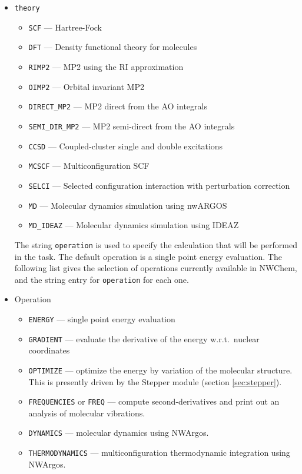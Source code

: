 \begin{itemize}
\item \verb+theory+ \newline
\begin{itemize}
 \item \verb+SCF+ --- Hartree-Fock
 \item \verb+DFT+ --- Density functional theory for molecules
 \item \verb+RIMP2+ --- MP2 using the RI approximation
 \item \verb+OIMP2+ --- Orbital invariant MP2
 \item \verb+DIRECT_MP2+ --- MP2 direct from the AO integrals
 \item \verb+SEMI_DIR_MP2+ --- MP2 semi-direct from the AO integrals
 \item \verb+CCSD+ --- Coupled-cluster single and double excitations
 \item \verb+MCSCF+ --- Multiconfiguration SCF
 \item \verb+SELCI+ --- Selected configuration interaction with perturbation
   correction 
 \item \verb+MD+ --- Molecular dynamics simulation using nwARGOS
 \item \verb+MD_IDEAZ+ --- Molecular dynamics simulation using IDEAZ
\end{itemize}

The string \verb+operation+ is used to specify the calculation that will
be performed in the task.  The default operation is a single point energy
evaluation.  The following list gives the selection of operations currently
available in NWChem, and the string entry for \verb+operation+ for each one.

\item Operation \newline
\begin{itemize}
 \item \verb+ENERGY+ --- single point energy evaluation
 \item \verb+GRADIENT+ --- evaluate the derivative of the energy w.r.t.\
   nuclear coordinates
 \item \verb+OPTIMIZE+ --- optimize the energy by variation of the molecular
   structure.  This is presently driven by the Stepper module
   (section \ref{sec:stepper}). 
 \item \verb+FREQUENCIES+ or \verb+FREQ+ --- compute second-derivatives and print
   out an analysis of molecular vibrations.
 \item \verb+DYNAMICS+ --- molecular dynamics using NWArgos.
 \item \verb+THERMODYNAMICS+ --- multiconfiguration thermodynamic integration
    using NWArgos.
\end{itemize} 


\end{itemize}

